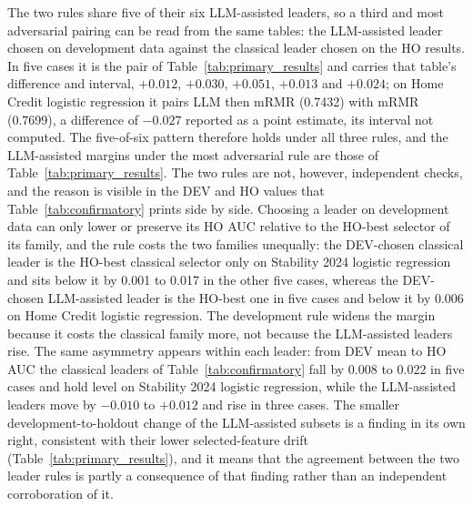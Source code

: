 \documentclass[final,5p,twocolumn]{elsarticle}
\begin{document}
The two rules share five of their six LLM-assisted leaders, so a third and most adversarial pairing can be read from the same tables: the LLM-assisted leader chosen on development data against the classical leader chosen on the HO results. In five cases it is the pair of Table~\ref{tab:primary_results} and carries that table's difference and interval, $+0.012$, $+0.030$, $+0.051$, $+0.013$ and $+0.024$; on Home Credit logistic regression it pairs LLM then mRMR (0.7432) with mRMR (0.7699), a difference of $-0.027$ reported as a point estimate, its interval not computed. The five-of-six pattern therefore holds under all three rules, and the LLM-assisted margins under the most adversarial rule are those of Table~\ref{tab:primary_results}. The two rules are not, however, independent checks, and the reason is visible in the DEV and HO values that Table~\ref{tab:confirmatory} prints side by side. Choosing a leader on development data can only lower or preserve its HO AUC relative to the HO-best selector of its family, and the rule costs the two families unequally: the DEV-chosen classical leader is the HO-best classical selector only on Stability 2024 logistic regression and sits below it by 0.001 to 0.017 in the other five cases, whereas the DEV-chosen LLM-assisted leader is the HO-best one in five cases and below it by 0.006 on Home Credit logistic regression. The development rule widens the margin because it costs the classical family more, not because the LLM-assisted leaders rise. The same asymmetry appears within each leader: from DEV mean to HO AUC the classical leaders of Table~\ref{tab:confirmatory} fall by 0.008 to 0.022 in five cases and hold level on Stability 2024 logistic regression, while the LLM-assisted leaders move by $-0.010$ to $+0.012$ and rise in three cases. The smaller development-to-holdout change of the LLM-assisted subsets is a finding in its own right, consistent with their lower selected-feature drift (Table~\ref{tab:primary_results}), and it means that the agreement between the two leader rules is partly a consequence of that finding rather than an independent corroboration of it.
\end{document}
